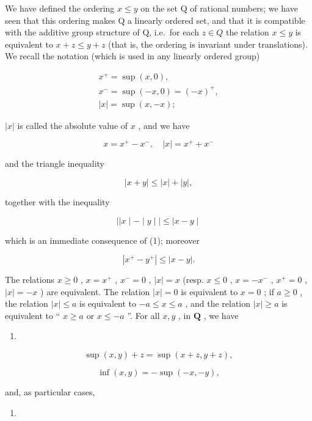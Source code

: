 We have defined the ordering \(x \leqslant y\) on the set Q of rational numbers; we have seen that this ordering makes Q a linearly ordered set, and that it is compatible with the additive group structure of Q, i.e.~for each \(z \in Q\) the relation \(x \leqslant y\) is equivalent to \(x + z \leqslant y + z\) (that is, the ordering is invariant under translations). We recall the notation (which is used in any linearly ordered group)

\[
\begin{array}{l} x ^ {+} = \sup (x, 0), \\ x ^ {-} = \sup (- x, 0) = (- x) ^ {+}, \\ | x | = \sup (x, - x); \end{array}
\]

\(|x|\) is called the absolute value of \(x\) , and we have

\[
x = x ^ {+} - x ^ {-}, \quad | x | = x ^ {+} + x ^ {-}
\]

and the triangle inequality

\[
| x + y | \leqslant | x | + | y |,\tag{1}
\]

together with the inequality

\[
\mid | x \mid - \mid y \mid \mid \leqslant \mid x - y \mid\tag{2}
\]

which is an immediate consequence of (1); moreover

\[
\left| x ^ {+} - y ^ {+} \right| \leqslant | x - y |.\tag{3}
\]

The relations \(x \geqslant 0\) , \(x = x^{+}\) , \(x^{-} = 0\) , \(|x| = x\) (resp. \(x \leqslant 0\) , \(x = -x^{-}\) , \(x^{+} = 0\) , \(|x| = -x\) ) are equivalent. The relation \(|x| = 0\) is equivalent to \(x = 0\) ; if \(a \geqslant 0\) , the relation \(|x| \leqslant a\) is equivalent to \(-a \leqslant x \leqslant a\) , and the relation \(|x| \geqslant a\) is equivalent to `` \(x \geqslant a\) or \(x \leqslant -a\) ''. For all \(x, y\) , in \(\mathbf{Q}\) , we have

\begin{enumerate}
\def\labelenumi{(\arabic{enumi})}
\setcounter{enumi}{3}
\tightlist
\item
\end{enumerate}

\[
\sup (x, y) + z = \sup (x + z, y + z),\tag{4}
\]

\[
\inf (x, y) = - \sup (- x, - y),\tag{5}
\]

and, as particular cases,

\begin{enumerate}
\def\labelenumi{(\arabic{enumi})}
\setcounter{enumi}{5}
\tightlist
\item
\end{enumerate}

